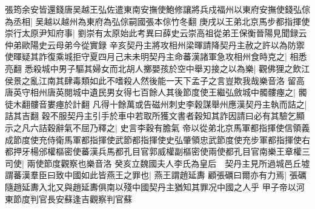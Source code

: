 張筠余安皆還錢唐吴越王弘佐遣東南安撫使鮑修讓將兵戍福州以東府安撫使錢弘倧為丞相|{
	吴越以越州為東府為弘倧嗣國張本倧竹冬翻}
庚戌以王弟北京馬步都指揮使崇行太原尹知府事|{
	劉崇有太原始此考異曰薛史云崇高祖從弟王保衡晉陽見聞録云仲弟歐陽史云母弟今從實録}
辛亥契丹主將攻相州梁暉請降契丹主赦之許以為防禦使暉疑其詐復乘城拒守夏四月己未未明契丹主命蕃漢諸軍急攻相州食時克之|{
	相悉亮翻}
悉殺城中男子驅其婦女而北胡人擲嬰孩於空中舉刃接之以為樂|{
	觀佛狸之飲江侯景之亂江南其肆毒類如此不嗜殺人然後能一天下孟子之言豈欺我哉樂音洛}
留高唐英守相州唐英閱城中遺民男女得七百餘人其後節度使王繼弘斂城中髑髏瘞之|{
	髑徒木翻髏音婁瘞於計翻}
凡得十餘萬或告磁州刺史李穀謀舉州應漢契丹主執而詰之|{
	詰其吉翻}
穀不服契丹主引手於車中若取所獲文書者穀知其詐因請曰必有其驗乞顯示之凡六詰穀辭氣不屈乃釋之|{
	史言李穀有膽氣}
帝以從弟北京馬軍都指揮使信領義成節度使充侍衛馬軍都指揮使武節都指揮使史弘肇領忠武節度使充步軍都指揮使右都押牙楊邠權樞密使蕃漢兵馬都孔目官郭威權副樞密使兩使都孔目官南樂王章權三司使|{
	兩使節度觀察也樂音洛}
癸亥立魏國夫人李氏為皇后　契丹主見所過城邑丘墟謂蕃漢羣臣曰致中國如此皆燕王之罪也|{
	燕王謂趙延夀}
顧張礪曰爾亦有力焉|{
	張礪隨趙延夀入北又與趙延夀俱南以殘中國契丹主猶知其罪况中國之人乎}
甲子帝以河東節度判官長安蘇逢吉觀察判官蘇

